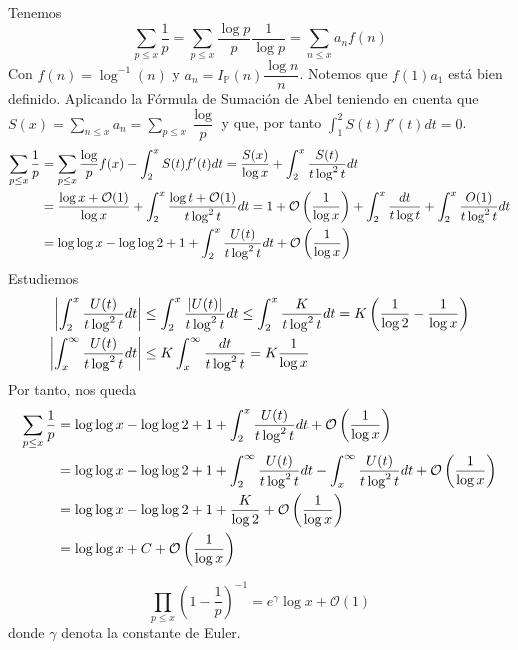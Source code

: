 \documentclass[TAN.tex]{subfiles}
\begin{document}
\begin{dem}
Tenemos
$$
\sum_{p≤x} \frac{1}{p} = \sum_{p≤x} \frac{\log p}{p}\frac{1}{\log p} = \sum_{n≤x} a_n f(n)
$$
Con $f(n)=\log^{-1}(n)$ y $a_n = I_{\mathbb{P}}(n)\dfrac{\log n}{n}$. Notemos que $f(1)a_1$ está bien definido. Aplicando la Fórmula de Sumación de Abel teniendo en cuenta que $S(x)=\sum_{n\leq x}a_n = \sum_{p\leq x}\dfrac{\log}{p}$ y que, por tanto $\int_1^2S(t)f'(t)dt = 0$.
\begin{align*}
\sum_{p\leq x}\frac{1}{p}&= \sum_{p\leq x}\dfrac{\log}{p}f(x)-\int_2^x S(t)f'(t)dt = \frac{S(x)}{\log x} +\int_2^x \frac{S(t)}{t\log^2t}dt \\
&=\frac{\log x + \mathcal{O}(1)}{\log x} +\int_2^x \frac{\log t + \mathcal{O}(1)}{t\log^2t}dt = 1 + \mathcal{O}\left({\frac{1}{\log x}}\right)+\int_2^x\frac{dt}{t\log t}+\int_2^x\frac{O(1)}{t\log^2 t}dt\\
&=\log\log x - \log\log 2 +1 + \int_2^x\frac{U(t)}{t\log^2 t}dt+ \mathcal{O}\left({\frac{1}{\log x}}\right)
\end{align*}
Estudiemos 
\begin{align*}
\left|\int_2^x\frac{U(t)}{t\log^2 t}dt\right|&\leq \int_2^x\frac{\left|U(t)\right|}{t\log^2 t}dt \leq \int_2^x\frac{K}{t\log^2 t}dt = K\left(\frac{1}{\log 2}-\frac{1}{\log x} \right)\\
\left|\int_x^\infty \frac{U(t)}{t\log^2 t}dt\right|&\leq K\int_x^{\infty}\frac{dt}{t\log^2t} = K\frac{1}{\log x}
\end{align*}
Por tanto, nos queda
\begin{align*}
\sum_{p\leq x}\frac{1}{p} &=  \log\log x - \log\log 2 +1 + \int_2^x\frac{U(t)}{t\log^2 t}dt+ \mathcal{O}\left({\frac{1}{\log x}}\right)\\
&=\log\log x - \log\log 2 +1 + \int_2^\infty\frac{U(t)}{t\log^2 t}dt- \int_x^\infty\frac{U(t)}{t\log^2 t}dt+\mathcal{O}\left({\frac{1}{\log x}}\right)\\
&=\log\log x - \log\log 2 +1 + \frac{K}{\log 2} + \mathcal{O}\left({\frac{1}{\log x}}\right)\\
&=\log\log x +C+ \mathcal{O}\left({\frac{1}{\log x}}\right)
\end{align*}
\end{dem}
\begin{teorema}
\[ \prod_{p≤x} \left(1-\frac{1}{p}\right)^{-1} = e^γ\log x + \mathcal{O}(1) \]
donde $γ$ denota la constante de Euler.
\end{teorema}
\end{document}
